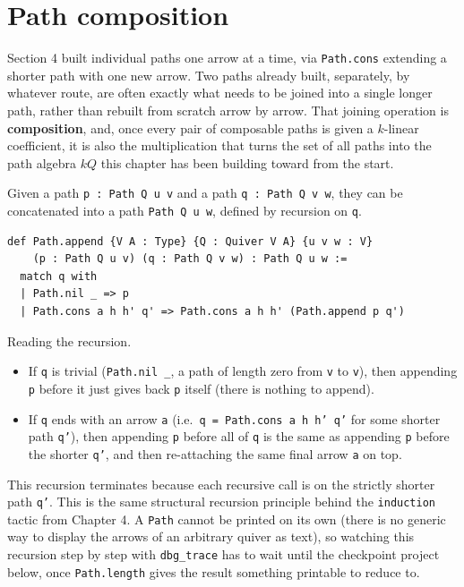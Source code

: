 \section{Path composition}\label{sec:11-path-algebras:05-path-composition:1}

Section 4 built individual paths one arrow at a time, via \texttt{Path.cons} extending a shorter path with one new arrow. Two paths already built, separately, by whatever route, are often exactly what needs to be joined into a single longer path, rather than rebuilt from scratch arrow by arrow. That joining operation is \textbf{composition}, and, once every pair of composable paths is given a \(k\)-linear coefficient, it is also the multiplication that turns the set of all paths into the path algebra \(kQ\) this chapter has been building toward from the start.

Given a path \texttt{p : Path Q u v} and a path \texttt{q : Path Q v w}, they can be concatenated into a path \texttt{Path Q u w}, defined by recursion on \texttt{q}.

\begin{lstlisting}
def Path.append {V A : Type} {Q : Quiver V A} {u v w : V}
    (p : Path Q u v) (q : Path Q v w) : Path Q u w :=
  match q with
  | Path.nil _ => p
  | Path.cons a h h' q' => Path.cons a h h' (Path.append p q')
\end{lstlisting}

Reading the recursion.

\begin{itemize}
\tightlist
\item
  If \texttt{q} is trivial (\texttt{Path.nil \_\allowbreak{}}, a path of length zero from \texttt{v} to \texttt{v}), then appending \texttt{p} before it just gives back \texttt{p} itself (there is nothing to append).
\item
  If \texttt{q} ends with an arrow \texttt{a} (i.e.~\texttt{q = Path.cons a h h' q'} for some shorter path \texttt{q'}), then appending \texttt{p} before all of \texttt{q} is the same as appending \texttt{p} before the shorter \texttt{q'}, and then re-attaching the same final arrow \texttt{a} on top.
\end{itemize}

This recursion terminates because each recursive call is on the strictly shorter path \texttt{q'}. This is the same structural recursion principle behind the \texttt{induction} tactic from Chapter 4. A \texttt{Path} cannot be printed on its own (there is no generic way to display the arrows of an arbitrary quiver as text), so watching this recursion step by step with \texttt{dbg\_\allowbreak{}trace} has to wait until the checkpoint project below, once \texttt{Path.length} gives the result something printable to reduce to.

